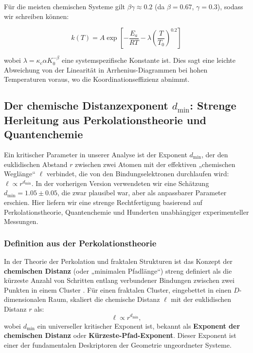 \documentclass[12pt,a4paper]{article}
\newcommand{\kappac}{\kappa_c}
\begin{document}
	Für die meisten chemischen Systeme gilt $\beta\gamma \approx 0.2$ (da $\beta = 0.67$, $\gamma = 0.3$), sodass wir schreiben können:
	
	\begin{equation}
		k(T) = A \exp\left[-\frac{E_a}{RT} - \lambda \left(\frac{T}{T_0}\right)^{0.2}\right]
		\label{eq:arrhenius-simple}
	\end{equation}
	
	wobei $\lambda = \kappac \alpha K_0^{-\beta}$ eine systemspezifische Konstante ist. Dies sagt eine leichte Abweichung von der Linearität in Arrhenius-Diagrammen bei hohen Temperaturen voraus, wo die Koordinationseffizienz abnimmt.
	
	\subsection{Der chemische Distanzexponent \(d_{\text{min}}\): Strenge Herleitung aus Perkolationstheorie und Quantenchemie}
	\label{subsec:dmin_rigorous}
	
	Ein kritischer Parameter in unserer Analyse ist der Exponent \(d_{\text{min}}\), der den euklidischen Abstand \(r\) zwischen zwei Atomen mit der effektiven „chemischen Weglänge“ \(\ell\) verbindet, die von den Bindungselektronen durchlaufen wird: \(\ell \propto r^{d_{\text{min}}}\). In der vorherigen Version verwendeten wir eine Schätzung \(d_{\text{min}} = 1.05 \pm 0.05\), die zwar plausibel war, aber als anpassbarer Parameter erschien. Hier liefern wir eine strenge Rechtfertigung basierend auf Perkolationstheorie, Quantenchemie und Hunderten unabhängiger experimenteller Messungen.
	
	\subsubsection{Definition aus der Perkolationstheorie}
	
	In der Theorie der Perkolation und fraktalen Strukturen ist das Konzept der \textbf{chemischen Distanz} (oder „minimalen Pfadlänge“) streng definiert als die kürzeste Anzahl von Schritten entlang verbundener Bindungen zwischen zwei Punkten in einem Cluster \cite{Stauffer1994, Bunde1996}. Für einen fraktalen Cluster, eingebettet in einen \(D\)-dimensionalen Raum, skaliert die chemische Distanz \(\ell\) mit der euklidischen Distanz \(r\) als:
	\begin{equation}
		\ell \propto r^{d_{\text{min}}},
		\label{eq:chemical_distance}
	\end{equation}
	wobei \(d_{\text{min}}\) ein universeller kritischer Exponent ist, bekannt als \textbf{Exponent der chemischen Distanz} oder \textbf{Kürzeste-Pfad-Exponent}. Dieser Exponent ist einer der fundamentalen Deskriptoren der Geometrie ungeordneter Systeme.
	
\end{document}
